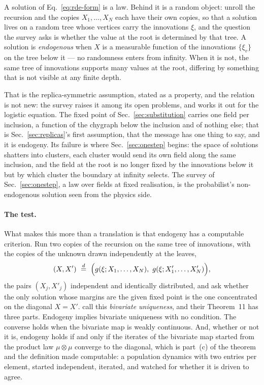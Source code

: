 A solution of Eq.~\eqref{eq:rde-form} is a law. Behind it is a random
object: unroll the recursion and the copies $X_{1},\dots,X_{N}$ each have
their own copies, so that a solution lives on a random tree whose vertices
carry the innovations $\xi$, and the question the survey asks is whether the
value at the root is determined by that tree. A solution is
\emph{endogenous} when $X$ is a measurable function of the innovations
$\{\xi_{v}\}$ on the tree below it --- no randomness enters from infinity.
When it is not, the same tree of innovations supports many values at the
root, differing by something that is not visible at any finite depth.

That is the replica-symmetric assumption, stated as a property, and the
relation is not new: the survey raises it among its open problems, and
\citet{bandyopadhyay2011} works it out for the logistic equation. The
fixed point of Sec.~\ref{sec:substitution} carries one field per inclusion,
a function of the chygraph below the inclusion and of nothing else; that is
Sec.~\ref{sec:replicas}'s first assumption, that the message has one thing
to say, and it is endogeny. Its failure is where Sec.~\ref{sec:onestep}
begins: the space of solutions shatters into clusters, each cluster would
send its own field along the same inclusion, and the field at the root is
no longer fixed by the innovations below it but by which cluster the
boundary at infinity selects. The survey of Sec.~\ref{sec:onestep}, a law
over fields at fixed realisation, is the probabilist's non-endogenous
solution seen from the physics side.

\paragraph{The test.} What makes this more than a translation is that
endogeny has a computable criterion. Run two copies of the recursion on
the same tree of innovations, with the copies of the unknown drawn
independently at the leaves,
\begin{equation}
  (X,X')\ \stackrel{d}{=}\
  \Bigl(g(\xi;X_{1},\dots,X_{N}),\ g(\xi;X'_{1},\dots,X'_{N})\Bigr),
  \label{eq:rde-bivariate}
\end{equation}
the pairs $(X_{j},X'_{j})$ independent and identically distributed, and ask
whether the only solution whose margins are the given fixed point
is the one concentrated on the diagonal $X=X'$. \citet{aldous2005} call
this \emph{bivariate uniqueness}, and their Theorem~11 has three parts.
Endogeny implies bivariate uniqueness with no condition. The converse holds
when the bivariate map is weakly continuous. And, whether or not it is,
endogeny holds if and only if the iterates of the bivariate map started
from the product law $\mu\otimes\mu$ converge to the diagonal, which is
part~(c) of the theorem and the definition made computable: a population
dynamics with two entries per element, started independent, iterated, and
watched for whether it is driven to agree.

